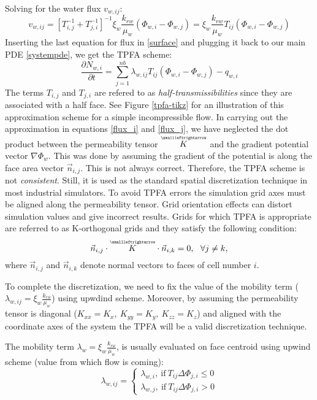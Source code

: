 Solving for the water flux $v_{w, ij}$:
\begin{equation}
v_{w, ij} = [T_{i,j}^{-1}+T_{j,i}^{-1}]^{-1}\xi_{w}\frac{k_{rw}}{\mu_{w}} (\Phi_{w,i}-\Phi_{w,j}) = \xi_{w}\frac{k_{rw}}{\mu_{w}}T_{ij}(\Phi_{w,i}-\Phi_{w,j})
\end{equation}
Inserting the last equation for flux in \ref{surface} and plugging it back to our main PDE \ref{systempde}, we get the TPFA scheme:
\begin{equation}
	\boxed{\frac{\partial N_{w,i}}{\partial t} = \sum_{j=1}^{nb}\lambda_{w,ij}T_{ij}(\Phi_{w,i}-\Phi_{w,j})- q_{w,i}}
\label{tpfa}
\end{equation}
The terms $T_{i,j}$ and $T_{j,i}$ are refered to as \textit{half-transmissibilities} since they are associated with a half face.
See Figure \ref{tpfa-tikz} for an illustration of this approximation scheme for a simple incompressible flow.
In carrying out the approximation in equations \ref{flux_i} and \ref{flux_j}, we have neglected the dot product between the permeability tensor $\tensor{K}$ and
the gradient potential vector $\nabla\Phi_{w}$. This was done by assuming the gradient of the potential is along the face area vector $\vec{n}_{i,j}$. This is not always correct.
Therefore, the TPFA scheme is not \textit{consistent}. Still, it is used as the standard spatial discretization technique in most industrial simulators. To avoid TPFA errors the simulation
grid axes must be aligned along the permeability tensor. Grid orientation effects can distort simulation values and give incorrect results. Grids for which TPFA is appropriate are referred to as
K-orthogonal grids and they satisfy the following condition:
\begin{equation}
	\vec{n}_{i,j}\cdot\tensor{K}\cdot\vec{n}_{i,k} = 0, \ \ \forall j\neq k,
	\label{korthogonal}
\end{equation}
where $\vec{n}_{i,j}$ and $\vec{n}_{i,k}$ denote normal vectors to faces of cell number $i$.

To complete the discretization, we need to fix the value of the mobility term ($\lambda_{w,ij}=\xi_{w}\frac{k_{rw}}{\mu_{w}}$)   using upwdind scheme.
Moreover, by assuming the permeability tensor is diagonal ($K_{xx} = K_{x}, \ K_{yy} = K_{y},\ K_{zz} = K_{z}$) and aligned with the coordinate axes of the system
the TPFA will be a valid discretization technique.

The mobility term $\lambda_{w} = \xi_{w}\frac{k_{rw}}{\mu_{w}}$, is usually evaluated on face centroid using upwind scheme (value from which flow is coming):
\begin{equation}
	\lambda_{w,ij} = 
	\begin{cases}
		\lambda_{w,i}, \ \text{if}\ T_{ij}\Delta\Phi_{j,i} \leq 0\\
		\lambda_{w,j}, \ \text{if}\ T_{ij}\Delta\Phi_{j,i} > 0
	\end{cases}
	\label{upwind}
\end{equation}

